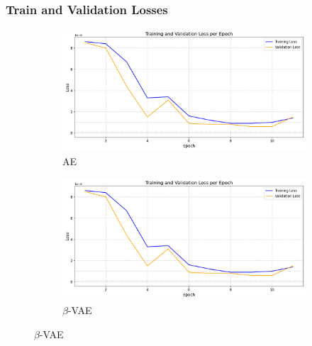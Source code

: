 \clearpage

\subsubsection{Train and Validation Losses}

\begin{figure}[!h]
  \centering
  \begin{subfigure}[t]{.6\textwidth}
    \centering
    \includegraphics[width=\linewidth]{figures/losses/ae.png}
    \caption{AE}
  \end{subfigure}
  \hfill
  \begin{subfigure}[t]{.6\textwidth}
    \centering
    \includegraphics[width=\linewidth]{figures/losses/ae.png}
    \caption{$\beta$-VAE}
  \end{subfigure}
  
  \vspace{1cm}
  

\end{figure}
